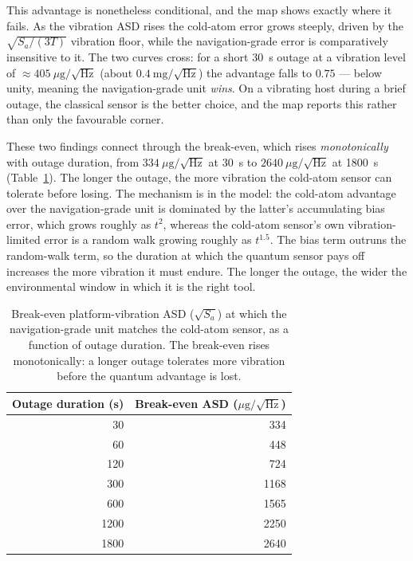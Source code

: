 This advantage is nonetheless conditional, and the map shows exactly
where it fails. As the vibration ASD rises the cold-atom error grows steeply, driven
by the $\sqrt{S_a/(3T)}$ vibration floor, while the navigation-grade error is
comparatively insensitive to it. The two curves cross: for a short
\SI{30}{\second} outage at a vibration level of
$\approx 405~\mu\mathrm{g}/\sqrt{\mathrm{Hz}}$ (about $0.4~\mathrm{mg}/\sqrt{\mathrm{Hz}}$)
the advantage falls to $0.75$ --- below unity, meaning the navigation-grade unit
\emph{wins}. On a vibrating host during a brief outage, the classical sensor is the
better choice, and the map reports this rather than only the favourable
corner.

These two findings connect through the break-even, which rises
\emph{monotonically} with outage duration, from
$334~\mu\mathrm{g}/\sqrt{\mathrm{Hz}}$ at \SI{30}{\second} to
$2640~\mu\mathrm{g}/\sqrt{\mathrm{Hz}}$ at \SI{1800}{\second} (Table~\ref{tab:breakeven}).
The longer the outage, the more vibration the cold-atom sensor can tolerate before
losing. The mechanism is in the model: the cold-atom advantage over the
navigation-grade unit is dominated by the latter's accumulating bias error, which
grows roughly as $t^2$, whereas the cold-atom sensor's own vibration-limited error
is a random walk growing roughly as $t^{1.5}$. The bias term outruns the random-walk
term, so the duration at which the quantum sensor pays off increases the more
vibration it must endure. The longer the outage, the wider the environmental
window in which it is the right tool.

\begin{table}[t]
  \centering
  \caption{Break-even platform-vibration ASD ($\sqrt{S_a}$) at which the
  navigation-grade unit matches the cold-atom sensor, as a function of outage
  duration. The break-even rises monotonically: a longer outage tolerates more
  vibration before the quantum advantage is lost.}
  \label{tab:breakeven}
  \small
  \begin{tabular}{rr}
    \toprule
    Outage duration (s) & Break-even ASD ($\mu\mathrm{g}/\sqrt{\mathrm{Hz}}$) \\
    \midrule
    30   & 334  \\
    60   & 448  \\
    120  & 724  \\
    300  & 1168 \\
    600  & 1565 \\
    1200 & 2250 \\
    1800 & 2640 \\
    \bottomrule
  \end{tabular}
\end{table}

